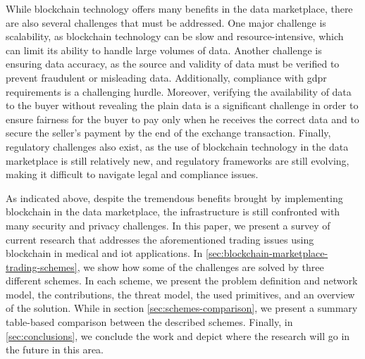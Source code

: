 While blockchain technology offers many benefits in the data marketplace, there are also several challenges that must be addressed. 
One major challenge is scalability, as blockchain technology can be slow and resource-intensive, which can limit its ability to handle large volumes of data.
Another challenge is ensuring data accuracy, as the source and validity of data must be verified to prevent fraudulent or misleading data.
Additionally, compliance with \ac{gdpr} requirements is a challenging hurdle.
Moreover, verifying the availability of data to the buyer without revealing the plain data is a significant challenge in order to ensure fairness for the buyer to pay only when he receives the correct data and to secure the seller's payment by the end of the exchange transaction.
Finally, regulatory challenges also exist, as the use of blockchain technology in the data marketplace is still relatively new, and regulatory frameworks are still evolving, making it difficult to navigate legal and compliance issues.

As indicated above, despite the tremendous benefits brought by implementing blockchain in the data marketplace, the infrastructure is still confronted with many security and privacy challenges.
In this paper, we present a survey of current research that addresses the aforementioned trading issues using blockchain in medical and \ac{iot} applications.
In \cref{sec:blockchain-marketplace-trading-schemes}, we show how some of the challenges are solved by three different schemes.
In each scheme, we present the problem definition and network model, the contributions, the threat model, the used primitives, and an overview of the solution.
While in section \cref{sec:schemes-comparison}, we present a summary table-based comparison between the described schemes.
Finally, in \cref{sec:conclusions}, we conclude the work and depict where the research will go in the future in this area.
